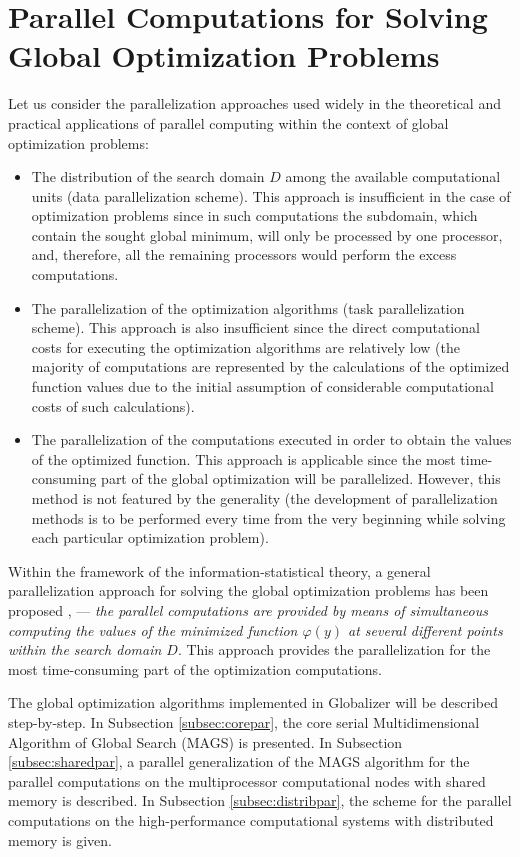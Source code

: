 \documentclass{aims}
\theoremstyle{definition}
\begin{document}
\section{Parallel Computations for Solving Global Optimization Problems}
\label{sec:parallel}
Let us consider the parallelization approaches used widely in the theoretical and
practical applications of parallel computing within the context of global optimization problems:
\begin{itemize}
  \item The distribution of the search domain \(D\) among the available computational units (data parallelization scheme). This approach is insufficient in the case of optimization problems since in such computations the subdomain, which contain the sought global minimum, will only be processed by one processor, and, therefore, all the remaining processors would perform the excess computations.
  \item The parallelization of the optimization algorithms (task parallelization scheme). This approach is also insufficient since the direct computational costs for executing the optimization algorithms are relatively low (the majority of computations are represented by the calculations of the optimized function values due to the initial assumption of considerable computational costs of such calculations).
  \item The parallelization of the computations executed in order to obtain the values of the optimized function. This approach is applicable since the most time-consuming part of the global optimization will be parallelized. However, this method is not featured by the generality (the development of parallelization methods is to be performed every time from the very beginning while solving each particular optimization problem).
\end{itemize}
\par
Within the framework of the information-statistical theory, a general parallelization
approach for solving the global optimization problems has been proposed \cite{stronginGergelBarkalovParGO}, \cite{strSergGO} --- \textit{the parallel computations are provided by means of simultaneous computing the values of the
minimized function \(\varphi(y)\) at several different points within the search domain \(D\)}.
This approach provides the parallelization for the most time-consuming part of the optimization computations.
\par
The global optimization algorithms implemented in Globalizer will be described step-by-step.
In Subsection \ref{subsec:corepar}, the core serial Multidimensional Algorithm of Global
Search (MAGS) is presented. In Subsection \ref{subsec:sharedpar}, a parallel generalization
of the MAGS algorithm for the parallel computations on the multiprocessor computational
nodes with shared memory is described. In Subsection \ref{subsec:distribpar}, the scheme
for the parallel computations on the high-performance computational systems with distributed memory is given.
\end{document}
